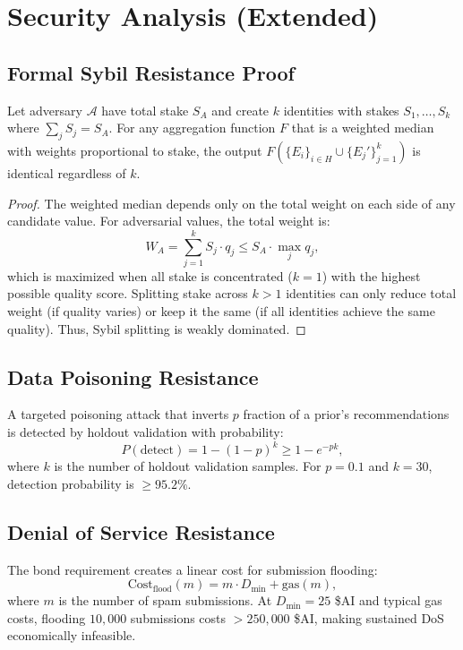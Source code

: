 \section{Security Analysis (Extended)}

\label{app:security}

\subsection{Formal Sybil Resistance Proof}

\begin{theorem}
Let adversary $\mathcal{A}$ have total stake $S_A$ and create $k$ identities
with stakes $S_1, \ldots, S_k$ where $\sum_j S_j = S_A$. For any aggregation
function $F$ that is a weighted median with weights proportional to stake, the
output $F(\{E_i\}_{i \in H} \cup \{E_j'\}_{j=1}^k)$ is identical regardless
of $k$.
\end{theorem}

\begin{proof}
The weighted median depends only on the total weight on each side of any
candidate value. For adversarial values, the total weight is:
\begin{equation}
    W_A = \sum_{j=1}^k S_j \cdot q_j \leq S_A \cdot \max_j q_j,
\end{equation}
which is maximized when all stake is concentrated ($k = 1$) with the highest
possible quality score. Splitting stake across $k > 1$ identities can only
reduce total weight (if quality varies) or keep it the same (if all identities
achieve the same quality). Thus, Sybil splitting is weakly dominated.
\end{proof}

\subsection{Data Poisoning Resistance}

\begin{proposition}
A targeted poisoning attack that inverts $p$ fraction of a prior's
recommendations is detected by holdout validation with probability:
\begin{equation}
    P(\text{detect}) = 1 - (1 - p)^k \geq 1 - e^{-pk},
\end{equation}
where $k$ is the number of holdout validation samples. For $p = 0.1$ and
$k = 30$, detection probability is $\geq 95.2\%$.
\end{proposition}

\subsection{Denial of Service Resistance}

The bond requirement creates a linear cost for submission flooding:
\begin{equation}
    \text{Cost}_{\text{flood}}(m) = m \cdot D_{\min} + \text{gas}(m),
\end{equation}
where $m$ is the number of spam submissions. At $D_{\min} = 25$ \$AI and
typical gas costs, flooding $10{,}000$ submissions costs $> 250{,}000$ \$AI,
making sustained DoS economically infeasible.

